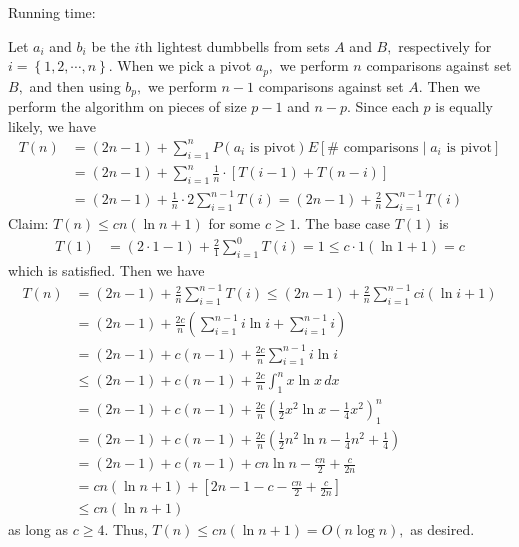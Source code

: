 \documentclass{article}
\begin{document}
\begin{soln}
	Running time:
	\begin{subproof}
		Let $a_i$ and $b_i$ be the $i$th lightest dumbbells from sets $A$ and $B,$ respectively for $i=\left\{ 1, 2, \cdots, n \right\}.$ When we pick a pivot $a_p,$ we perform $n$ comparisons against set $B,$ and then using $b_p,$ we perform $n-1$ comparisons against set $A.$ Then we perform the algorithm on pieces of size $p-1$ and $n-p.$ Since each $p$ is equally likely, we have
		\begin{align*}
			T(n) &= (2n-1) + \sum_{i=1}^{n} P(a_i\text{ is pivot}) E[\#\text{ comparisons}\mid a_i\text{ is pivot}] \\
			&= (2n-1) + \sum_{i=1}^{n}\frac{1}{n}\cdot \left[ T(i-1) + T(n-i) \right] \\
			&= (2n-1) + \frac{1}{n}\cdot 2\sum_{i=1}^{n-1} T(i) = (2n-1) + \frac{2}{n} \sum_{i=1}^{n-1} T(i)
		\end{align*}
		Claim: $T(n)\le cn(\ln n + 1)$ for some $c\ge 1.$ The base case $T(1)$ is
		\begin{align*}
			T(1) &= (2\cdot 1 - 1) + \frac{2}{1}\sum_{i=1}^{0} T(i) = 1 \le c\cdot 1(\ln 1+1) = c
		\end{align*}
		which is satisfied. Then we have
		\begin{align*}
			T(n) &= (2n-1) + \frac{2}{n} \sum_{i=1}^{n-1} T(i) \le (2n-1) + \frac{2}{n} \sum_{i=1}^{n-1} ci(\ln i + 1) \\
			&= (2n-1) + \frac{2c}{n} \left( \sum_{i=1}^{n-1} i\ln i + \sum_{i=1}^{n-1} i \right) \\
			&= (2n-1) + c(n-1) + \frac{2c}{n} \sum_{i=1}^{n-1} i\ln i  \\
			&\le (2n-1) + c(n-1) + \frac{2c}{n}\int_1^n x\ln x\, dx \\
			&= (2n-1) + c(n-1) + \frac{2c}{n} \left( \frac{1}{2}x^2\ln x - \frac{1}{4}x^2 \right)^n_1 \\
			&= (2n-1) + c(n-1) + \frac{2c}{n} \left( \frac{1}{2}n^2\ln n - \frac{1}{4}n^2 + \frac{1}{4} \right) \\
			&= (2n-1) + c(n-1) + cn\ln n - \frac{cn}{2} + \frac{c}{2n} \\
			&= cn(\ln n + 1) + \left[ 2n-1-c - \frac{cn}{2} + \frac{c}{2n} \right] \\
			&\le cn(\ln n+1)
		\end{align*}
		as long as $c\ge 4.$ Thus, $T(n)\le cn(\ln n+1) = O(n\log n),$ as desired.
	\end{subproof}
\end{soln}
\end{document}
